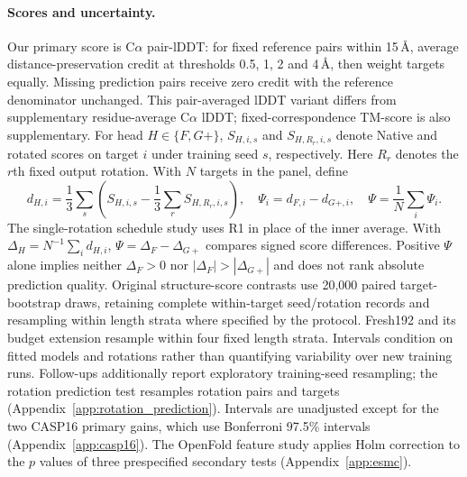 \paragraph{Scores and uncertainty.}
Our primary score is C$\alpha$ pair-lDDT: for fixed reference pairs within
15\,\AA, average distance-preservation credit at thresholds 0.5, 1, 2 and
4\,\AA, then weight targets equally. Missing prediction pairs receive zero
credit with the reference denominator unchanged. This pair-averaged lDDT
variant \citep{mariani2013lddt} differs from supplementary residue-average
C$\alpha$ lDDT; fixed-correspondence TM-score \citep{zhang2004tm} is also
supplementary. For head $H\in\{F,G+\}$, $S_{H,i,s}$ and
$S_{H,R_r,i,s}$ denote Native and rotated scores on target $i$ under
training seed $s$, respectively. Here $R_r$ denotes the $r$th fixed output
rotation. With $N$ targets in the panel, define
\begin{equation}
 d_{H,i}=\frac13\sum_s\left(S_{H,i,s}-\frac13\sum_rS_{H,R_r,i,s}\right),
 \quad \Psi_i=d_{F,i}-d_{G+,i},\quad
 \Psi=\frac1N\sum_i\Psi_i.\label{eq:interaction}
\end{equation}
The single-rotation schedule study uses R1 in place of the inner average.
With $\Delta_H=N^{-1}\sum_i d_{H,i}$,
$\Psi=\Delta_F-\Delta_{G+}$ compares signed score differences.
Positive $\Psi$ alone implies neither $\Delta_F>0$ nor
$|\Delta_F|>|\Delta_{G+}|$ and does not rank absolute prediction quality.
Original structure-score contrasts use 20,000 paired target-bootstrap draws,
retaining complete within-target seed/rotation records and resampling
within length strata where specified by the protocol. Fresh192 and its
budget extension resample within four fixed length strata. Intervals
condition on fitted models and rotations rather than quantifying
variability over new training runs. Follow-ups additionally report exploratory
training-seed resampling; the rotation prediction test resamples rotation
pairs and targets (Appendix~\ref{app:rotation_prediction}). Intervals are
unadjusted except for the two CASP16 primary gains, which use Bonferroni
97.5\% intervals (Appendix~\ref{app:casp16}). The OpenFold feature study
applies Holm correction to the $p$ values of three prespecified secondary
tests \citep{holm1979simple}
(Appendix~\ref{app:esmc}).
